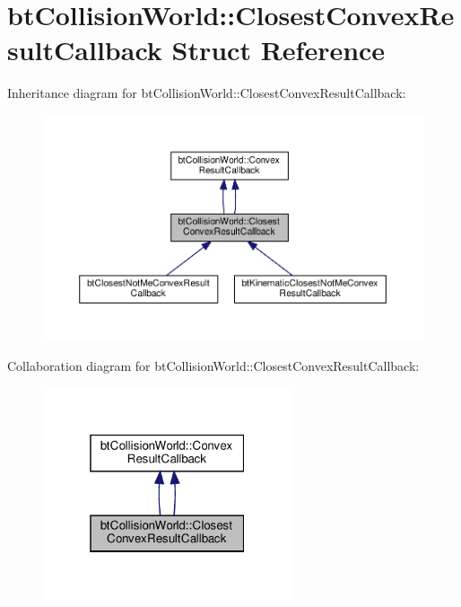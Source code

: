 \hypertarget{structbtCollisionWorld_1_1ClosestConvexResultCallback}{}\section{bt\+Collision\+World\+:\+:Closest\+Convex\+Result\+Callback Struct Reference}
\label{structbtCollisionWorld_1_1ClosestConvexResultCallback}


Inheritance diagram for bt\+Collision\+World\+:\+:Closest\+Convex\+Result\+Callback\+:
\nopagebreak
\begin{figure}[H]
\begin{center}
\leavevmode
\includegraphics[width=350pt]{structbtCollisionWorld_1_1ClosestConvexResultCallback__inherit__graph}
\end{center}
\end{figure}


Collaboration diagram for bt\+Collision\+World\+:\+:Closest\+Convex\+Result\+Callback\+:
\nopagebreak
\begin{figure}[H]
\begin{center}
\leavevmode
\includegraphics[width=208pt]{structbtCollisionWorld_1_1ClosestConvexResultCallback__coll__graph}
\end{center}
\end{figure}
